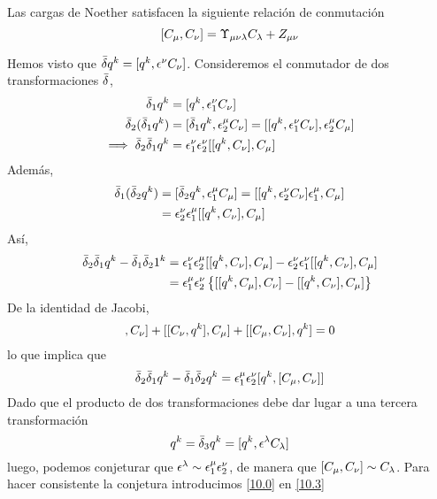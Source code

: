 \begin{teor}
	Las cargas de Noether satisfacen la siguiente relación de conmutación
	\begin{equation}\label{10.0}
  [C_\mu,C_\nu]=\Upsilon_{\mu\nu\lambda}C_\lambda + Z_{\mu\nu }
\end{equation}
\end{teor}

\begin{prueba}
	Hemos visto que $\bar{\delta} q^k=[q^k,\epsilon^\nu C_\nu ]$. Consideremos el conmutador de dos transformaciones $\bar{\delta}$,
	\begin{align}
  \bar{\delta}_1 q^k&=[q^k,\epsilon_1^\nu C_\nu ]\\
  \bar{\delta}_2(\bar{\delta}_1 q^k)&=[\bar{\delta}_1q^k,\epsilon^\mu_2C_\nu ]=[[q^k,\epsilon_1^\nu C_\nu ],\epsilon_2^\mu C_\mu ]\\
  \implies \bar{\delta}_2\bar{\delta}_1 q^k&=\epsilon_1^\nu \epsilon_2^\nu [[q^k,C_\nu ],C_\mu ]\label{10.1}
\end{align}
Además,
\begin{align}
  \bar{\delta}_1(\bar{\delta}_2  q^k)&=[\bar{\delta}_2 q^k,\epsilon^\mu _1C_\mu ]=[[q^k,\epsilon_2^\nu C_\nu ]\epsilon_1^\mu ,C_\mu ]\\
  &=\epsilon_2^\nu \epsilon_1^\mu [[q^k,C_\nu ],C_\mu ]
\end{align}
Así,
\begin{align}
  \bar{\delta}_2\bar{\delta}_1q^k-\bar{\delta}_1\bar{\delta}_21^k&=\epsilon_1^\nu \epsilon_2^\mu [[q^k,C_\nu ],C_\mu] -\epsilon_2^\nu \epsilon_1^\nu [[q^k,C_\nu],C_\mu ]\\
  &=\epsilon_1^\mu \epsilon_2^\nu \left\{[[q^k,C_\mu ],C_\nu ]-[[q^k,C_\nu ],C_\mu ]\right\}
\end{align}
De la identidad de Jacobi,
\begin{equation}
  [[q^k,C_\m ],C_\n ]+ [[C_\n ,q^k ],C_\m  ]+ [[C_\m ,C_\n  ],q^k ]=0
\end{equation}
lo que implica que
\begin{equation}\label{10.3}
  \bar{\delta}_2\bar{\delta}_1q^k-\bar{\delta}_1\bar{\delta}_2q^k=\epsilon_1^\mu \epsilon_2^\nu [q^k,[C_\mu,C_\nu ]]
\end{equation}
Dado que el producto de dos transformaciones debe dar lugar a una tercera transformación
\begin{equation}
  [\db_2,\db_1]q^k=\db_3q^k=[q^k,\epsilon^\lambda C_\lambda]
\end{equation}
luego, podemos conjeturar que $\epsilon^\lambda\sim \epsilon_1^\mu \epsilon_2^\nu $, de manera que $[C_\mu ,C_\nu ]\sim C_\lambda$. Para hacer consistente la conjetura introducimos \eqref{10.0} en \eqref{10.3}
\begin{align}

\end{align}
\end{prueba}

